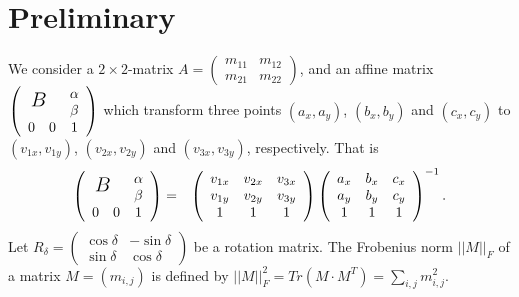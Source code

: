 \documentclass[8pt]{article}
\begin{document}
\section{Preliminary}
We consider a $2\times 2$-matrix
$\displaystyle A = 
\left(
\begin{array}{cc}
 m_{11} & m_{12} \\
 m_{21} & m_{22}
\end{array}
\right)$,
and an affine matrix
$\left(
     \begin{array}{ccc}
 	\multicolumn{2}{c}{\multirow{2}{*}{\mbox {\smash{\Large $B$ }}}}&\alpha \\
    	\multicolumn{2}{c}{}&\beta\\
      0&0&1   
     \end{array}
\right)$
which transform three points
$(a_x,a_y)$, $(b_x,b_y)$ and $(c_x,c_y)$
to
$(v_{1x},v_{1y})$, $(v_{2x},v_{2y})$ and $(v_{3x},v_{3y})$,
respectively.
That is
\begin{eqnarray*}
\left(
     \begin{array}{ccc}
 	\multicolumn{2}{c}{\multirow{2}{*}{\mbox {\smash{\Large $B$ }}}}&\alpha \\
    	\multicolumn{2}{c}{}&\beta\\
      0&0&1   
     \end{array}
  \right) &=&
  \left(
    \begin{array}{ccc}
      v_{1x} & v_{2x} & v_{3x} \\
      v_{1y} & v_{2y} & v_{3y} \\
      1 & 1 & 1
    \end{array}
  \right)
  \left(
    \begin{array}{ccc}
     a_x & b_x & c_x \\
     a_y & b_y & c_y \\
      1 & 1 & 1
    \end{array}
  \right)^{-1}.
\end{eqnarray*}
Let 
$\displaystyle R_\delta =
\left(
\begin{array}{cc}
 \cos \delta & -\sin \delta \\
 \sin \delta & \cos \delta
\end{array}
\right)$
be a rotation matrix.
The Frobenius norm $|| M ||_F$ of a matrix $M=(m_{i,j})$
is defined by $\displaystyle ||M||^2_F=Tr(M\cdot M^T)=\sum_{i,j} m^2_{i,j}$.
\end{document}
